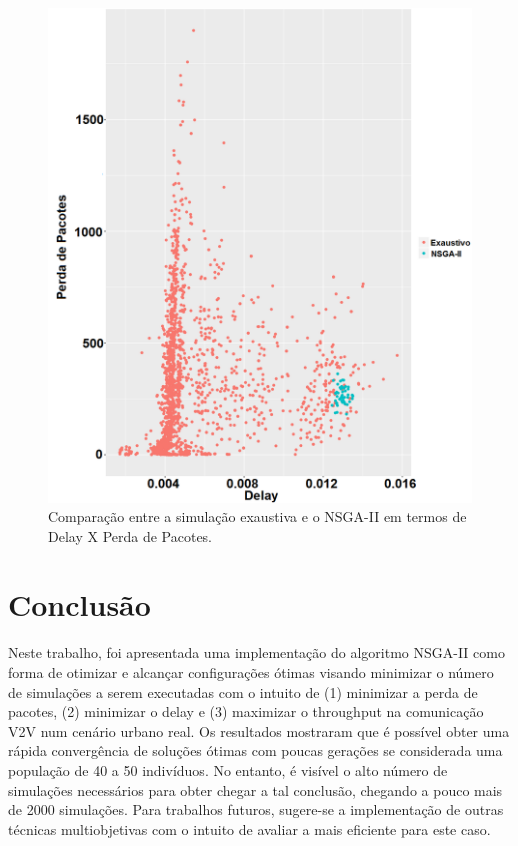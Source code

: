\documentclass[conference]{IEEEtran}
\begin{document}
\begin{figure}[h]
  \centering
  \includegraphics[scale=0.27]{figures/ExaustivoXNsgaii_DelayXPerdaPacotes.png}
  \caption{Comparação entre a simulação exaustiva e o NSGA-II em termos de Delay X Perda de Pacotes.}
  \label{fig:exaustivo-nsgaii-3}
\end{figure}



\section{Conclusão}

Neste trabalho, foi apresentada uma implementação do algoritmo NSGA-II como forma de otimizar e alcançar configurações ótimas visando minimizar o número de simulações a serem executadas com o intuito de (1) minimizar a perda de pacotes, (2) minimizar o delay e (3) maximizar o throughput na comunicação V2V num cenário urbano real.  Os resultados mostraram que é possível obter uma rápida convergência de soluções ótimas com poucas gerações se considerada uma população de 40 a 50 indivíduos. No entanto, é visível o alto número de simulações necessários para obter chegar a tal conclusão, chegando a pouco mais de 2000 simulações. Para trabalhos futuros, sugere-se a implementação de outras técnicas multiobjetivas com o intuito de avaliar a mais eficiente para este caso.






\end{document}

